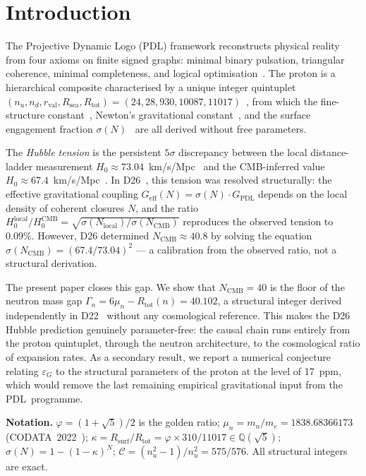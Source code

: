 \documentclass[11pt,a4paper]{article}
\theoremstyle{definition}
\newcommand{\PDL}{\textnormal{PDL}}
\newcommand{\Rsurf}{R_{\mathrm{surf}}}
\newcommand{\Rsea}{R_{\mathrm{sea}}}
\newcommand{\Rtot}{R_{\mathrm{tot}}}
\newcommand{\rval}{r_{\mathrm{val}}}
\newcommand{\epsg}{\varepsilon_G}
\newcommand{\calC}{\mathcal{C}}
\newcommand{\vp}{\varphi}
\newcommand{\Geff}{G_{\mathrm{eff}}}
\newcommand{\GPDL}{G_{\mathrm{PDL}}}
\newcommand{\Hzero}{H_0}
\newcommand{\kap}{\kappa}
\newcommand{\sig}{\sigma}
\begin{document}
\section{Introduction}
\label{sec:intro}

The Projective Dynamic Logo (\PDL) framework reconstructs physical reality from four axioms on finite signed graphs: minimal binary pulsation, triangular coherence, minimal completeness, and logical optimisation~\cite{PDL_Main_2026,PDL_Intro_2026}. The proton is a hierarchical composite characterised by a unique integer quintuplet $(n_u, n_d, \rval, \Rsea, \Rtot) = (24, 28, 930, 10087, 11017)$~\cite{Combinatorial_Proton_v2_2026}, from which the fine-structure constant~\cite{Alpha_PDL_v2_2026}, Newton's gravitational constant~\cite{Bridge_PDL_2026}, and the surface engagement fraction $\sig(N)$~\cite{Hubble_Resolution_PDL_2026} are all derived without free parameters.

The \emph{Hubble tension} is the persistent $5\sigma$ discrepancy between the local distance-ladder measurement $\Hzero \approx 73.04$~km/s/Mpc~\cite{Riess_2022,Freedman_2024} and the CMB-inferred value $\Hzero \approx 67.4$~km/s/Mpc~\cite{Planck_2020}. In D26~\cite{Hubble_Resolution_PDL_2026}, this tension was resolved structurally: the effective gravitational coupling $\Geff(N) = \sig(N)\cdot\GPDL$ depends on the local density of coherent closures $N$, and the ratio $\Hzero^{\mathrm{local}}/\Hzero^{\mathrm{CMB}} = \sqrt{\sig(N_{\mathrm{local}})/\sig(N_{\mathrm{CMB}})}$ reproduces the observed tension to $0.09\%$. However, D26 determined $N_{\mathrm{CMB}} \approx 40.8$ by solving the equation $\sig(N_{\mathrm{CMB}}) = (67.4/73.04)^2$ --- a calibration from the observed ratio, not a structural derivation.

The present paper closes this gap. We show that $N_{\mathrm{CMB}} = 40$ is the floor of the neutron mass gap $\Gamma_n = 6\mu_n - \Rtot(n) = 40.102$, a structural integer derived independently in D22~\cite{Nuclear_Stability_PDL_2026} without any cosmological reference. This makes the D26 Hubble prediction genuinely parameter-free: the causal chain runs entirely from the proton quintuplet, through the neutron architecture, to the cosmological ratio of expansion rates. As a secondary result, we report a numerical conjecture relating $\epsg$ to the structural parameters of the proton at the level of 17~ppm, which would remove the last remaining empirical gravitational input from the \PDL\ programme.

\medskip\noindent\textbf{Notation.} $\vp = (1+\sqrt{5})/2$ is the golden ratio; $\mu_n = m_n/m_e = 1838.68366173$ (CODATA~2022~\cite{CODATA_2022}); $\kap = \Rsurf/\Rtot = \vp \times 310/11017 \in \mathbb{Q}(\sqrt{5})$; $\sig(N) = 1-(1-\kap)^N$; $\calC = (n_u^2-1)/n_u^2 = 575/576$. All structural integers are exact.
\end{document}
